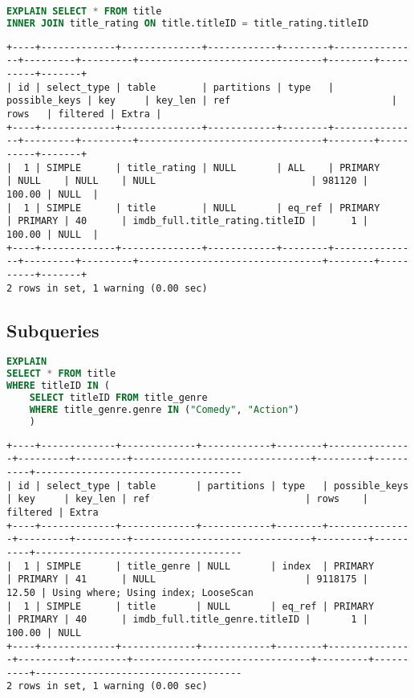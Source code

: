 \documentclass[12pt,a4paper]{article}
\begin{document}
\begin{lstlisting}[language=SQL]
EXPLAIN SELECT * FROM title
INNER JOIN title_rating ON title.titleID = title_rating.titleID
\end{lstlisting}
\begin{lstlisting}[basicstyle = \tiny\ttfamily, columns = fixed]
+----+-------------+--------------+------------+--------+---------------+---------+---------+--------------------------------+--------+----------+-------+
| id | select_type | table        | partitions | type   | possible_keys | key     | key_len | ref                            | rows   | filtered | Extra |
+----+-------------+--------------+------------+--------+---------------+---------+---------+--------------------------------+--------+----------+-------+
|  1 | SIMPLE      | title_rating | NULL       | ALL    | PRIMARY       | NULL    | NULL    | NULL                           | 981120 |   100.00 | NULL  |
|  1 | SIMPLE      | title        | NULL       | eq_ref | PRIMARY       | PRIMARY | 40      | imdb_full.title_rating.titleID |      1 |   100.00 | NULL  |
+----+-------------+--------------+------------+--------+---------------+---------+---------+--------------------------------+--------+----------+-------+
2 rows in set, 1 warning (0.00 sec)
\end{lstlisting}

\subsection{Subqueries}
\begin{lstlisting}[language=SQL]
EXPLAIN
SELECT * FROM title
WHERE titleID IN (
    SELECT titleID FROM title_genre 
    WHERE title_genre.genre IN ("Comedy", "Action")
    )
\end{lstlisting}
\begin{lstlisting}[basicstyle = \tiny\ttfamily, columns = fixed]
+----+-------------+-------------+------------+--------+---------------+---------+---------+-------------------------------+---------+----------+------------------------------------
| id | select_type | table       | partitions | type   | possible_keys | key     | key_len | ref                           | rows    | filtered | Extra                              
+----+-------------+-------------+------------+--------+---------------+---------+---------+-------------------------------+---------+----------+------------------------------------
|  1 | SIMPLE      | title_genre | NULL       | index  | PRIMARY       | PRIMARY | 41      | NULL                          | 9118175 |    12.50 | Using where; Using index; LooseScan
|  1 | SIMPLE      | title       | NULL       | eq_ref | PRIMARY       | PRIMARY | 40      | imdb_full.title_genre.titleID |       1 |   100.00 | NULL                               
+----+-------------+-------------+------------+--------+---------------+---------+---------+-------------------------------+---------+----------+------------------------------------
2 rows in set, 1 warning (0.00 sec)
\end{lstlisting}
\end{document}
